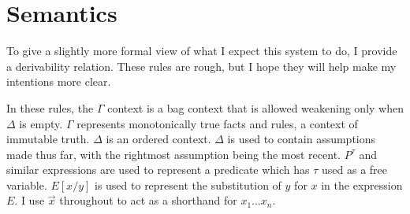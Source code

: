 \section{Semantics}
To give a slightly more formal view of what I expect this system to do, I provide a derivability relation.
These rules are rough, but I hope they will help make my intentions more clear.

In these rules, the $\Gamma$ context is a bag context that is allowed weakening only when $\Delta$ is empty.
$\Gamma$ represents monotonically true facts and rules, a context of immutable truth.
$\Delta$ is an ordered context.
$\Delta$ is used to contain assumptions made thus far, with the rightmost assumption being the most recent.
$P^\tau$ and similar expressions are used to represent a predicate which has $\tau$ used as a free variable.
$E[x/y]$ is used to represent the substitution of $y$ for $x$ in the expression $E$.
I use $\vec{x}$ throughout to act as a shorthand for $x_1 \ldots x_n$.
\newcommand{\ds}{\vdash}
